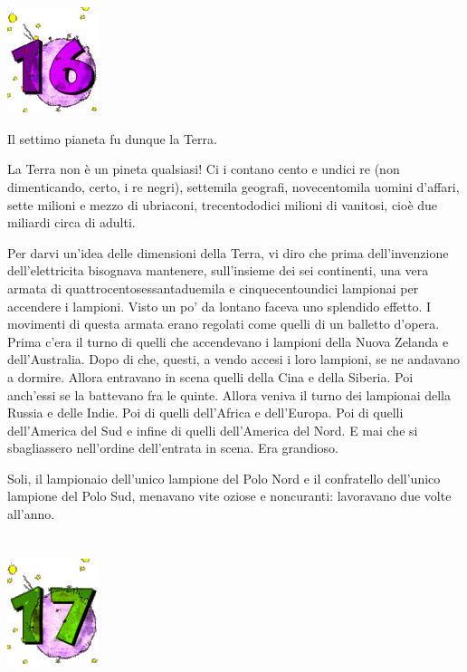 \documentclass[11pt]{scrbook}
\begin{document}
\chapter{}
\begin{center}
\includegraphics{img/chapter16}
\end{center}

Il settimo pianeta fu dunque la Terra.

La Terra non è un pineta qualsiasi! Ci i contano cento e undici re (non
dimenticando, certo, i re negri), settemila geografi, novecentomila
uomini d'affari, sette milioni e mezzo di ubriaconi, trecentododici
milioni di vanitosi, cioè due miliardi circa di adulti.

Per darvi un'idea delle dimensioni della Terra, vi diro che prima
dell'invenzione dell'elettricita bisognava mantenere, sull'insieme dei
sei continenti, una vera armata di quattrocentosessantaduemila e
cinquecentoundici lampionai per accendere i lampioni. Visto un po' da
lontano faceva uno splendido effetto. I movimenti di questa armata erano
regolati come quelli di un balletto d'opera. Prima c'era il turno di
quelli che accendevano i lampioni della Nuova Zelanda e dell'Australia.
Dopo di che, questi, a vendo accesi i loro lampioni, se ne andavano a
dormire. Allora entravano in scena quelli della Cina e della Siberia.
Poi anch'essi se la battevano fra le quinte. Allora veniva il turno dei
lampionai della Russia e delle Indie. Poi di quelli dell'Africa e
dell'Europa. Poi di quelli dell'America del Sud e infine di quelli
dell'America del Nord. E mai che si sbagliassero nell'ordine
dell'entrata in scena. Era grandioso.

Soli, il lampionaio dell'unico lampione del Polo Nord e il confratello
dell'unico lampione del Polo Sud, menavano vite oziose e noncuranti:
lavoravano due volte all'anno.

\chapter{}
\begin{center}
\includegraphics{img/chapter17}
\end{center}
\end{document}
